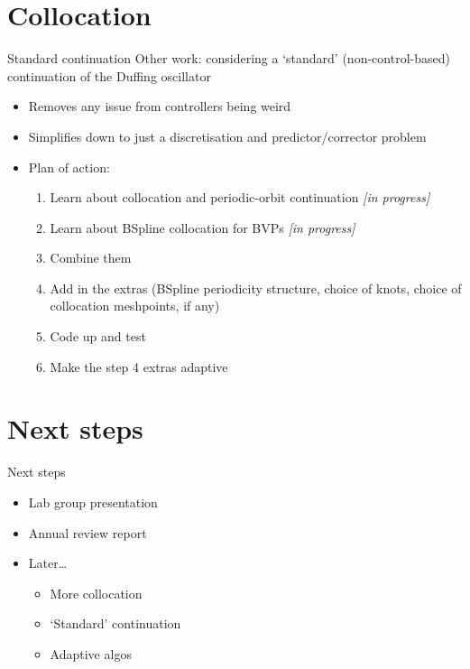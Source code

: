 \documentclass[presentation]{beamer}
\begin{document}
\section{Collocation}
\label{sec:org55fea93}
\begin{frame}[label={sec:orga731761}]{Standard continuation}
Other work: considering a `standard' (non-control-based) continuation of the Duffing oscillator
\vfill
\begin{itemize}
\item Removes any issue from controllers being weird
\item Simplifies down to just a discretisation and predictor/corrector problem
\end{itemize}
\vfill
\begin{itemize}
\item Plan of action:
\begin{enumerate}
\item Learn about collocation and periodic-orbit continuation \alert{\emph{[in progress]}}
\item Learn about BSpline collocation for BVPs \alert{\emph{[in progress]}}
\item Combine them
\item Add in the extras (BSpline periodicity structure, choice of knots, choice of collocation meshpoints, if any)
\item Code up and test
\item Make the step 4 extras adaptive
\end{enumerate}
\end{itemize}
\end{frame}

\section{Next steps}
\label{sec:orgea63103}
\begin{frame}[label={sec:org532f1ef}]{Next steps}
\begin{itemize}
\item Lab group presentation
\end{itemize}
\vfill
\begin{itemize}
\item Annual review report
\end{itemize}
\vfill
\begin{itemize}
\item Later\ldots{}
\begin{itemize}
\item More collocation
\item `Standard' continuation
\item Adaptive algos
\end{itemize}
\end{itemize}
\end{frame}
\end{document}
